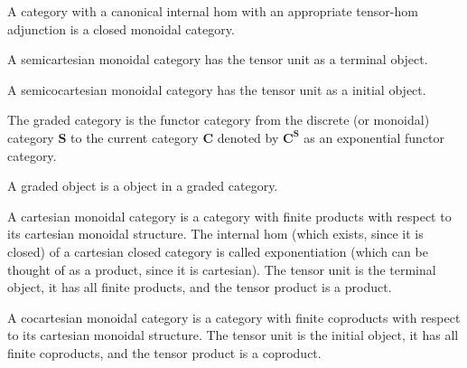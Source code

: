 \begin{definition}
    \label{definition-closed-monoidal-category}
    A category with a canonical internal hom with an appropriate tensor-hom adjunction is a closed monoidal category.
\end{definition}

\begin{definition}
    \label{definition-semicartesian-closed-monoidal-category}
    A semicartesian monoidal category has the tensor unit as a terminal object.
\end{definition}

\begin{definition}
    \label{definition-semicocartesian-monoidal-category}
    A semicocartesian monoidal category has the tensor unit as a initial object.
\end{definition}

\begin{definition}
    \label{definition-graded-category}
    The graded category is the functor category from the discrete (or monoidal) category $\mathbf{S}$ to the current category $\mathbf{C}$ denoted by $\mathbf{C}^\mathbf{S}$ as an exponential functor category. 
\end{definition}

\begin{definition}
    \label{definition-graded-object}
    A graded object is a object in a graded category.
\end{definition}

\begin{definition}
    \label{definition-cartesian-monoidal}
    A cartesian monoidal category is a category with finite products with respect to its cartesian monoidal structure. The internal hom (which exists, since it is closed) of a cartesian closed category is called exponentiation (which can be thought of as a product, since it is cartesian). The tensor unit is the terminal object, it has all finite products, and the tensor product is a product. 
\end{definition}

\begin{definition}
    \label{definition-cocartesian-monoidal}
    A cocartesian monoidal category is a category with finite coproducts with respect to its cartesian monoidal structure. The tensor unit is the initial object, it has all finite coproducts, and the tensor product is a coproduct. 
\end{definition}

